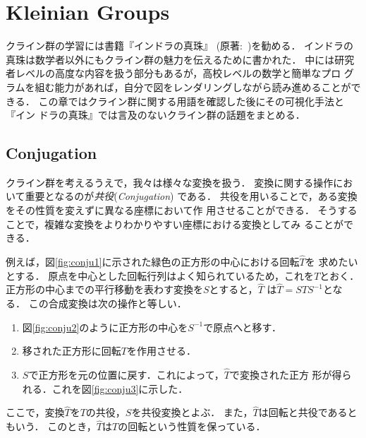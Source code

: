 
\section{Kleinian Groups}

クライン群の学習には書籍『インドラの真珠』\cite{komori-indra201303}
(原著:~\cite{MumfordSeriesWright200204})を勧める．
インドラの真珠は数学者以外にもクライン群の魅力を伝えるために書かれた．
中には研究者レベルの高度な内容を扱う部分もあるが，高校レベルの数学と簡単なプロ
グラムを組む能力があれば，自分で図をレンダリングしながら読み進めることができる．
この章ではクライン群に関する用語を確認した後にその可視化手法と『イン
ドラの真珠』では言及のないクライン群の話題をまとめる．

\subsection{Conjugation}

クライン群を考えるうえで，我々は様々な変換を扱う．
変換に関する操作において重要となるのが\emph{共役}(\textit{Conjugation})
である．
共役を用いることで，ある変換をその性質を変えずに異なる座標において作
用させることができる．
そうすることで，複雑な変換をよりわかりやすい座標における変換としてみ
ることができる．

例えば，図\ref{fig:conju1}に示された緑色の正方形の中心における回転$\hat{T}$を
求めたいとする．
原点を中心とした回転行列はよく知られているため，これを$T$とおく．
正方形の中心までの平行移動を表わす変換を$S$とすると，$\hat{T}$
は$\hat{T} = STS^{-1}$となる．
この合成変換は次の操作と等しい．
\begin{enumerate}
 \item 図\ref{fig:conju2}のように正方形の中心を$S^{-1}$で原点へと移す．
 \item 移された正方形に回転$T$を作用させる．
 \item $S$で正方形を元の位置に戻す．これによって，$\hat{T}$で変換された正方
       形が得られる．これを図\ref{fig:conju3}に示した．
\end{enumerate}

ここで，変換$\hat{T}$を$T$の共役，$S$を共役変換とよぶ．
また，$\hat{T}$は回転と共役であるともいう．
このとき，$\hat{T}$は$T$の回転という性質を保っている．

